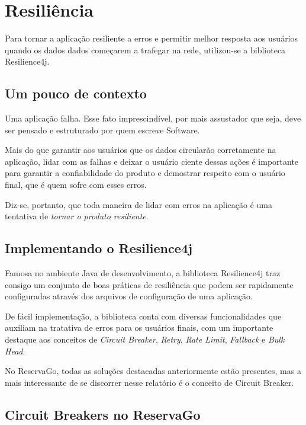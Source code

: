 \documentclass[12pt, openright, oneside, a4paper, article,
  section=TITLE
]{abntex2}
\begin{document}
\section{Resiliência}

Para tornar a aplicação resiliente a erros e permitir melhor resposta aos usuários quando os dados dados começarem a trafegar na rede, utilizou-se a biblioteca Resilience4j.

\subsection{Um pouco de contexto}

Uma aplicação falha. Esse fato imprescindível, por mais assustador que seja, deve ser pensado e estruturado por quem escreve Software. 

Mais do que garantir aos usuários que os dados circularão corretamente na aplicação, lidar com as falhas e deixar o usuário ciente dessas ações é importante para garantir a confiabilidade do produto e demostrar respeito com o usuário final, que é quem sofre com esses erros. 

Diz-se, portanto, que toda maneira de lidar com erros na aplicação é uma tentativa de \textit{tornar o produto resiliente}.

\subsection{Implementando o Resilience4j}

Famosa no ambiente Java de desenvolvimento, a biblioteca Resilience4j traz consigo um conjunto de boas práticas de resiliência que podem ser rapidamente configuradas através dos arquivos de configuração de uma aplicação.

De fácil implementação, a biblioteca conta com diversas funcionalidades que auxiliam na tratativa de erros para os usuários finais, com um importante destaque aos conceitos de \textit{Circuit Breaker}, \textit{Retry}, \textit{Rate Limit}, \textit{Fallback} e \textit{Bulk Head}.

No ReservaGo, todas as soluções destacadas anteriormente estão presentes, mas a mais interessante de se discorrer nesse relatório é o conceito de Circuit Breaker.

\subsection{Circuit Breakers no ReservaGo}
\end{document}

